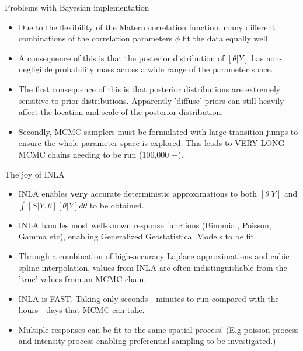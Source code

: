 \documentclass{beamer}
\begin{document}
\begin{frame}{Problems with Bayesian implementation}

\begin{itemize}
\item Due to the flexibility of the Matern correlation function, many different combinations of the correlation parameters $\phi$ fit the data equally well.
\item A consequence of this is that the posterior distribution of $[\theta | Y]$ has non-negligible probability mass across a wide range of the parameter space.
\item The first consequence of this is that posterior distributions are extremely sensitive to prior distributions. Apparently 'diffuse' priors can still heavily affect the location and scale of the posterior distribution.
\item Secondly, MCMC samplers must be formulated with large transition jumps to ensure the whole parameter space is explored. This leads to VERY LONG MCMC chains needing to be run (100,000 +).
\end{itemize}

\end{frame}

\begin{frame}{The joy of INLA}

\begin{itemize}
\item INLA enables \textbf{very} accurate deterministic approximations to both $[\theta | Y]$ and $\int [S | Y, \theta ] [ \theta | Y ] d \theta$ to be obtained.
\item INLA handles most well-known response functions (Binomial, Poisson, Gamma etc), enabling Generalized Geostatistical Models to be fit.
\item Through a combination of high-accuracy Laplace approximations and cubic spline interpolation, values from INLA are often indistinguishable from the 'true' values from an MCMC chain.
\item INLA is FAST. Taking only seconds - minutes to run compared with the hours - days that MCMC can take. 
\item Multiple responses can be fit to the same spatial process! (E.g poisson process and intensity process enabling preferential sampling to be investigated.)
\end{itemize}

\end{frame}
\end{document}
